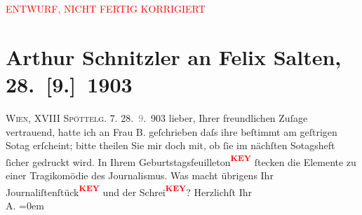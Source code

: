 
\begin{center}
            \textcolor{red}{ENTWURF, NICHT FERTIG KORRIGIERT}
                      \end{center}
            
         
         \newcommand{\erwaehntePersonen}{Personen: Emilie Mewes-Béha, Felix Salten}
         \newcommand{\erwaehnteOrte}{Orte: Edmund-Weiß-Gasse, Wien, XVIII., Währing}
         \newcommand{\erwaehnteWerke}{Werke: Die Zeit, Studie}
               \section[Arthur Schnitzler an Felix Salten, 28. {[}9.{]} 1903]{ Arthur Schnitzler an Felix Salten, 28. {[}9.{]} 1903}\nopagebreak{}\rehead{ }\begin{ledgroupsized}[t]{13cm}\normalsize\beginnumbering \toendnotes[C]{\smallbreak\pagebreak[2]} 
\toendnotes[C]{\smallbreak}\pstart
           \noindent{}{\pb}\textsc{Wien, XVIII}{ }\textsc{Spöttelg. 7}. \pend
           \pstart
           \raggedleft{}28. \textcolor{gray}{9}. 903\pend
           \pstart
           lieber, Ihrer freundlichen Zuſage vertrauend, hatte ich an Frau B. geſchrieben daſs ihre \label{K_L02982-1v}\label{K_L02982-1h} beſtimmt am geſtrigen So{\geminationn}tag erſcheint; bitte theilen Sie mir doch mit, ob ſie
               im nächſten So{\geminationn}tagsheft ſicher gedruckt wird. \pend
           \pstart
           {\pb}In Ihrem Geburtstagsfeuilleton\textcolor{red}{\textsuperscript{\textbf{KEY}}} ſtecken die Elemente zu einer Tragikomödie des
               Journalismus. Was macht übrigens Ihr Journaliſtenſtück\textcolor{red}{\textsuperscript{\textbf{KEY}}} und der Schrei\textcolor{red}{\textsuperscript{\textbf{KEY}}}? \pend
           \pstart
           Herzlichſt Ihr {\\[\baselineskip]}\spacefill\mbox{A.}\pend
           \leftskip=0em{}
         
         \endnumbering{}\end{ledgroupsized}\begin{anhang}\end{anhang}\newcommand{\dateiname}{L02982}\newcommand{\titel}{Arthur Schnitzler an Felix Salten, 28. [9.] 1903}\newcommand{\editorInnen}{Martin Anton Müller und Laura Untner}
      